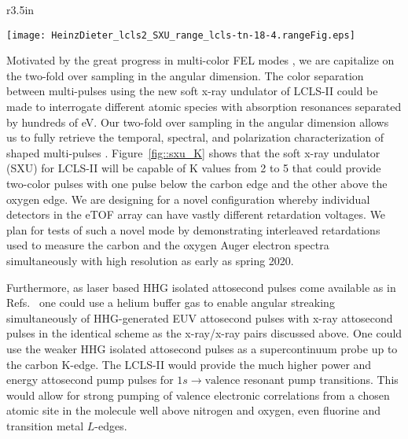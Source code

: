 \begin{wrapfigure}[16]{r}{3.5in}
\vspace{-1\baselineskip}
\centerline{
	\texttt{[image: HeinzDieter\_lcls2\_SXU\_range\_lcls-tn-18-4.rangeFig.eps]}
	}
\vspace{-1\baselineskip}
\caption{\label{fig::sxu_K} Soft x-ray undulator tuning range. \cite{HeinzDieter_SXU_twocolor}
	}
\end{wrapfigure}
Motivated by the great progress in multi-color FEL modes \cite{Lutman13_twocolor,Marinelli13_twocolor,Allaria2014,Marinelli2015,Prince2016,Lutman2016,Marinelli2016,Lutman2016FreshSlice}, we are capitalize on the two-fold over sampling in the angular dimension.
The color separation between multi-pulses using the new soft x-ray undulator of LCLS-II could be made to interrogate different atomic species with absorption resonances separated by hundreds of eV.
Our two-fold over sampling in the angular dimension allows us to fully retrieve the temporal, spectral, and polarization characterization of shaped multi-pulses \cite{Lutman2016,Lutman2016FreshSlice}.
Figure~\ref{fig::sxu_K} shows that the soft x-ray undulator (SXU) for LCLS-II will be capable of K values from 2 to 5 that could provide two-color pulses with one pulse below the carbon edge and the other above the oxygen edge.
We are designing for a novel configuration whereby individual detectors in the eTOF array can have vastly different retardation voltages.
We plan for tests of such a novel mode by demonstrating interleaved retardations used to measure the carbon and the oxygen Auger electron spectra simultaneously with high resolution as early as spring 2020.

Furthermore, as laser based HHG isolated attosecond pulses come available as in Refs.~\cite{Chen2014,Schmidt2016,Biegert2016,WornerSci2017} one could use a helium buffer gas to enable angular streaking simultaneously of HHG-generated EUV attosecond pulses with x-ray attosecond pulses in the identical scheme as the x-ray/x-ray pairs discussed above.
One could use the weaker HHG isolated attosecond pulses \cite{Biegert2016} as a supercontinuum probe up to the carbon K-edge.
The LCLS-II would provide the much higher power and energy attosecond pump pulses for $1s\rightarrow\mbox{valence}$ resonant pump transitions.
This would allow for strong pumping of valence electronic correlations from a chosen atomic site in the molecule well above nitrogen and oxygen, even fluorine and transition metal $L$-edges.

